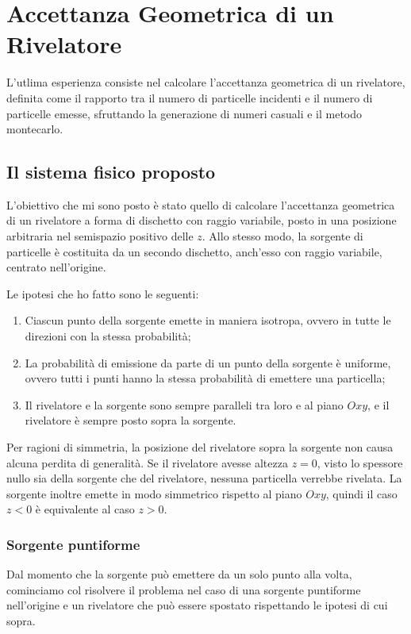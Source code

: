 \chapter{Accettanza Geometrica di un Rivelatore}\label{ch:acc}
    L'utlima esperienza consiste nel calcolare l'accettanza geometrica di un rivelatore, definita come il rapporto tra il numero di particelle incidenti e il numero di particelle emesse, sfruttando la generazione di numeri casuali e il metodo montecarlo.

    \section{Il sistema fisico proposto}
        L'obiettivo che mi sono posto è stato quello di calcolare l'accettanza geometrica di un rivelatore a forma di dischetto con raggio variabile, posto in una posizione arbitraria nel semispazio positivo delle $z$. Allo stesso modo, la sorgente di particelle è costituita da un secondo dischetto, anch'esso con raggio variabile, centrato nell'origine.

        Le ipotesi che ho fatto sono le seguenti:
        \begin{enumerate}
            \item Ciascun punto della sorgente emette in maniera isotropa, ovvero in tutte le direzioni con la stessa probabilità;
            \item La probabilità di emissione da parte di un punto della sorgente è uniforme, ovvero tutti i punti hanno la stessa probabilità di emettere una particella;
            \item Il rivelatore e la sorgente sono sempre paralleli tra loro e al piano $Oxy$, e il rivelatore è sempre posto sopra la sorgente.
        \end{enumerate}

        Per ragioni di simmetria, la posizione del rivelatore sopra la sorgente non causa alcuna perdita di generalità. Se il rivelatore avesse altezza $z=0$, visto lo spessore nullo sia della sorgente che del rivelatore, nessuna particella verrebbe rivelata. La sorgente inoltre emette in modo simmetrico rispetto al piano $Oxy$, quindi il caso $z<0$ è equivalente al caso $z>0$.

        \subsection{Sorgente puntiforme}\label{ss:acc:sorgente-puntiforme}
            Dal momento che la sorgente può emettere da un solo punto alla volta, cominciamo col risolvere il problema nel caso di una sorgente puntiforme nell'origine e un rivelatore che può essere spostato rispettando le ipotesi di cui sopra. 
            
